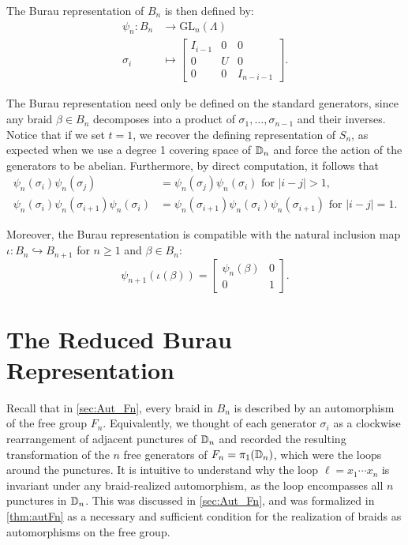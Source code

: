 The Burau representation of $B_n$ is then defined by:
\begin{align}
    \psi_n:B_n&\to\textrm{GL}_n(\Lambda) \\
    \sigma_i &\mapsto \begin{bmatrix}
        I_{i-1} & 0 & 0 \\
        0 & U & 0 \\
        0 & 0 & I_{n-i-1}
    \end{bmatrix}.
\end{align}

The Burau representation need only be defined on the standard generators, since any braid $\beta\in B_n$ decomposes into a product of $\sigma_1,\dots,\sigma_{n-1}$ and their inverses. Notice that if we set $t = 1$, we recover the defining representation of $S_n$, as expected when we use a degree 1 covering space of $\mathbb{D}_n$ and force the action of the generators to be abelian. Furthermore, by direct computation, it follows that
\begin{align}
    \psi_n(\sigma_i)\psi_n(\sigma_j) &= \psi_n(\sigma_j)\psi_n(\sigma_i) \textrm{ for } |i-j|>1, \\
    \psi_n(\sigma_i)\psi_n(\sigma_{i+1})\psi_n(\sigma_i) &= \psi_n(\sigma_{i+1})\psi_n(\sigma_i)\psi_n(\sigma_{i+1}) \textrm{ for } |i-j|=1.
\end{align}

Moreover, the Burau representation is compatible with the natural inclusion map $\iota:B_n\hookrightarrow B_{n+1}$ for $n\geq 1$ and $\beta\in B_n$:
\begin{equation}
    \psi_{n+1}(\iota(\beta)) = \begin{bmatrix}
        \psi_n(\beta) & 0 \\
        0 & 1
    \end{bmatrix}.
\end{equation}

\section{The Reduced Burau Representation}
Recall that in \cref{sec:Aut_Fn}, every braid in $B_n$ is described by an automorphism of the free group $F_n$. Equivalently, we thought of each generator $\sigma_i$ as a clockwise rearrangement of adjacent punctures of $\mathbb{D}_n$ and recorded the resulting transformation of the $n$ free generators of $F_n = \pi_1(\mathbb{D}_n)$, which were the loops around the punctures. It is intuitive to understand why the loop $\ell=x_1\cdots x_n$ is invariant under any braid-realized automorphism, as the loop  encompasses all $n$ punctures in $\mathbb{D}_n$. This was discussed in \cref{sec:Aut_Fn}, and was formalized in \cref{thm:autFn} as a necessary and sufficient condition for the realization of braids as automorphisms on the free group.

